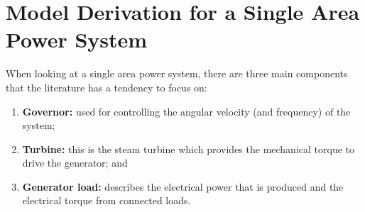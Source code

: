 \chapter{Model Derivation for a Single Area Power System}
When looking at a single area power system, there are three main components that the literature has a tendency to focus on:
\begin{enumerate}
	\item \textbf{Governor:} used for controlling the angular velocity (and frequency) of the system;
	\item \textbf{Turbine:} this is the steam turbine which provides the mechanical torque to drive the generator; and
	\item \textbf{Generator load:} describes the electrical power that is produced and the electrical torque from connected loads. 
\end{enumerate}





